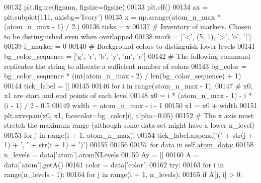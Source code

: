\begin{DoxyCode}
00132         plt.figure(fignum, figsize=figsize)
00133         plt.clf()
00134         ax = plt.subplot(111, axisbg=\textcolor{stringliteral}{'Ivory'})
00135         x = np.arange(atom\_n\_max * (atom\_n\_max - 1) / 2.)
00136         ticks = x
00137         \textcolor{comment}{# Inventory of markers. Chosen to be distinguished even when overlapped}
00138         mark = [\textcolor{stringliteral}{'<'}, (5, 1), \textcolor{stringliteral}{'>'}, \textcolor{stringliteral}{'o'}, \textcolor{stringliteral}{'|'}]
00139         i\_marker = 0
00140         \textcolor{comment}{# Background colors to distinguish lower levels }
00141         bg\_color\_sequence = [\textcolor{stringliteral}{'g'}, \textcolor{stringliteral}{'}\textcolor{stringliteral}{r', '}b', 'y', 'm', 'c']
00142         \textcolor{comment}{# The following command replicates the string to allocate a sufficient number of colors}
00143         bg\_color = bg\_color\_sequence * (int(atom\_n\_max - 2) / len(bg\_color\_sequence) + 1)
00144         tick\_label = []
00145         
00146         \textcolor{keywordflow}{for} i \textcolor{keywordflow}{in} range(atom\_n\_max - 1):
00147             \textcolor{comment}{# x0, x1 are start and end points of each level}
00148             x0 = i * (atom\_n\_max - 1) - i * (i - 1) / 2 - 0.5
00149             width = atom\_n\_max - i - 1
00150             x1 = x0 + width
00151             plt.axvspan(x0, x1, facecolor=bg\_color[i], alpha=0.05)
00152             \textcolor{comment}{# The x axis must stretch the maximum range (although some data set might have a lower n\_level)}
00153             \textcolor{keywordflow}{for} j \textcolor{keywordflow}{in} range(i + 1, atom\_n\_max):
00154                 tick\_label.append(\textcolor{stringliteral}{'('} + str(j + 1) + \textcolor{stringliteral}{', '} + str(i + 1) + \textcolor{stringliteral}{')'})
00155 
00156 
00157         \textcolor{keywordflow}{for} data \textcolor{keywordflow}{in} self.\hyperlink{classpyneb_1_1plot_1_1plot_atomic_data_1_1_data_plot_aee33ad460a38cb4293a5bd89cec12294}{atom\_data}:
00158             n\_levels = data[\textcolor{stringliteral}{'atom'}].atomNLevels
00159             Ay = []
00160             A = data[\textcolor{stringliteral}{'atom'}].getA()
00161             color = data[\textcolor{stringliteral}{'color'}]
00162             \textcolor{keywordflow}{try}:
00163                 \textcolor{keywordflow}{for} i \textcolor{keywordflow}{in} range(n\_levels - 1):
00164                     \textcolor{keywordflow}{for} j \textcolor{keywordflow}{in} range(i + 1, n\_levels):
00165                         \textcolor{keywordflow}{if} A[j, i] > 0:

\end{DoxyCode}
